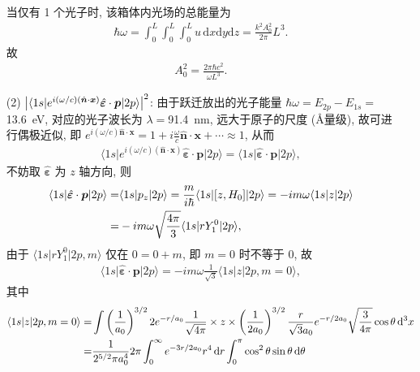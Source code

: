 \documentclass{assignment}
\begin{document}
\begin{pf}
\begin{itemize}
        当仅有 1 个光子时, 该箱体内光场的总能量为
        \begin{align}
            \hbar\omega=\int_0^L\int_0^L\int_0^Lu\,\mathrm{d}x\mathrm{d}y\mathrm{d}z=\frac{k^2A_0^2}{2\pi}L^3.
        \end{align}
        故
        \begin{align}
            A_0^2=\frac{2\pi\hbar c^2}{\omega L^3}.
        \end{align}
        \item[(2)] \uline{$\left\lvert\langle 1s\rvert e^{i(\omega/c)(\hat{\bm{n}}\cdot\bm{x})}\hat{\bm{\varepsilon}}\cdot\bm{p}\lvert 2p\rangle\right\rvert^2$}: 由于跃迁放出的光子能量 $\hbar\omega=E_{2p}-E_{1s}=$\SI{13.6}{eV}, 对应的光子波长为 $\lambda=$\SI{91.4}{nm}, 远大于原子的尺度 (\AA 量级), 故可进行偶极近似, 即 $e^{i(\omega/c)\hat{\bm{n}}\cdot\bm{x}}=1+i\frac{\omega}{c}\hat{\bm{n}}\cdot\bm{x}+\cdots\approx 1$, 从而
        \begin{align}
            \langle 1s\rvert e^{i(\omega/c)(\hat{\bm{n}}\cdot\bm{x})}\hat{\bm{\varepsilon}}\cdot\bm{p}\lvert 2p\rangle=\langle 1s\rvert\hat{\bm{\varepsilon}}\cdot\bm{p}\lvert 2p\rangle,
        \end{align}
        不妨取 $\hat{\bm{\varepsilon}}$ 为 $z$ 轴方向, 则
        \begin{align}
            \notag\langle 1s\rvert\hat{\bm{\varepsilon}}\cdot\bm{p}\lvert 2p\rangle=&\langle 1s\rvert p_z\lvert 2p\rangle=\frac{m}{i\hbar}\langle 1s\rvert[z,H_0]\lvert 2p\rangle=-im\omega\langle 1s\rvert z\lvert 2p\rangle\\
            =&-im\omega\sqrt{\frac{4\pi}{3}}\langle 1s\rvert rY_1^0\lvert 2p\rangle,
        \end{align}
        由于 $\langle 1s\rvert rY_1^0\lvert 2p,m\rangle$ 仅在 $0=0+m$, 即 $m=0$ 时不等于 $0$, 故
        \begin{align}
            \langle 1s\rvert\hat{\bm{\varepsilon}}\cdot\bm{p}\lvert 2p\rangle=-im\omega\frac{1}{\sqrt{3}}\langle 1s\rvert z\lvert 2p,m=0\rangle,
        \end{align}
        其中
        \begin{align}
            \langle 1s\rvert z\lvert 2p,m=0\rangle=&\int\left(\frac{1}{a_0}\right)^{3/2}2e^{-r/a_0}\frac{1}{\sqrt{4\pi}}\times z\times\left(\frac{1}{2a_0}\right)^{3/2}\frac{r}{\sqrt{3}a_0}e^{-r/2a_0}\sqrt{\frac{3}{4\pi}}\cos\theta\,\mathrm{d}^3x\\
            \notag=&\frac{1}{2^{5/2}\pi a_0^4}2\pi\int_0^{\infty}e^{-3r/2a_0}r^4\,\mathrm{d}r\int_0^{\pi}\cos^2\theta\sin\theta\,\mathrm{d}\theta\\

\end{align}
\end{itemize}
\end{pf}
\end{document}
